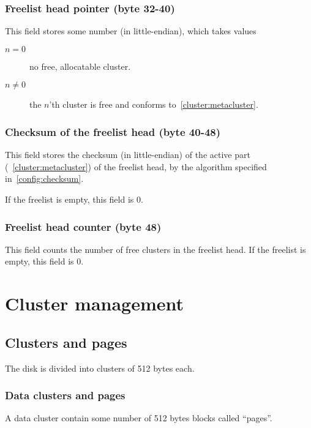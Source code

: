 \documentclass[11pt,a4paper]{report}
\newcommand{\clustersize}{512 }
\begin{document}
        \subsection{Freelist head pointer (byte 32-40)}
        \label{state:freelist_head}
        This field stores some number (in little-endian), which takes values

        \begin{description}
            \item [$n = 0$]    no free, allocatable cluster.
            \item [$n \neq 0$] the $n$'th cluster is free and conforms
                to~\ref{cluster:metacluster}.
        \end{description}

        \subsection{Checksum of the freelist head (byte 40-48)}
        This field stores the checksum (in little-endian) of the active part
        (~\ref{cluster:metacluster}) of the freelist head, by the algorithm
        specified in~\ref{config:checksum}.

        If the freelist is empty, this field is 0.

        \subsection{Freelist head counter (byte 48)}
        \label{state:freelist_head_counter}
        This field counts the number of free clusters in the freelist head. If
        the freelist is empty, this field is 0.

    \chapter{Cluster management}

    \section{Clusters and pages}
        The disk is divided into clusters of \clustersize bytes each.

        \subsection{Data clusters and pages}
        \label{cluster:page}
        A data cluster contain some number of \clustersize bytes blocks called
        ``pages''.
\end{document}
